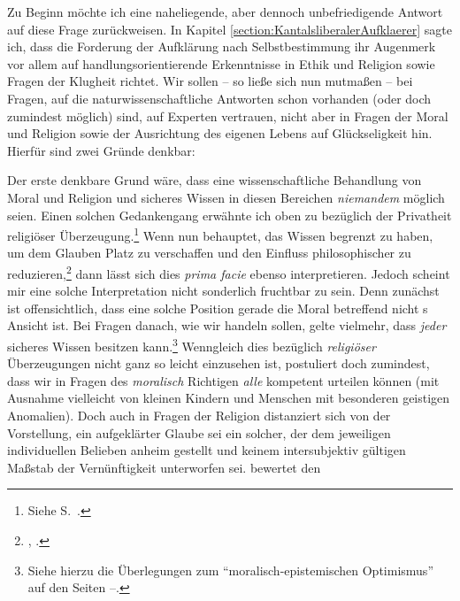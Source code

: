 Zu Beginn möchte ich eine naheliegende, aber dennoch unbefriedigende Antwort auf
diese Frage zurückweisen. In Kapitel \ref{section:KantalsliberalerAufklaerer}
sagte ich, dass die Forderung der Aufklärung nach Selbstbestimmung ihr Augenmerk
vor allem auf handlungsorientierende Erkenntnisse in Ethik und Religion sowie
Fragen der Klugheit richtet. Wir sollen -- so ließe sich nun mutmaßen -- bei
Fragen, auf die naturwissenschaftliche Antworten schon vorhanden (oder doch
zumindest möglich) sind, auf Experten vertrauen, nicht aber in Fragen der Moral
und Religion sowie der Ausrichtung des eigenen Lebens auf Glückseligkeit hin.
Hierfür sind zwei Gründe denkbar:
\begin{nummerierung}
\item Der erste denkbare Grund wäre, dass eine wissenschaftliche Behandlung von
Moral und Religion und sicheres Wissen in diesen Bereichen \emph{niemandem}
möglich seien. Einen solchen Gedankengang erwähnte ich oben zu
 bezüglich der Privatheit religiöser Überzeugung.\footnote{Siehe
S.~\pageref{ThomasiusZuPrivatheitreligioesenBekenntnisses}.} Wenn 
nun behauptet, das Wissen begrenzt zu haben, um dem Glauben Platz zu verschaffen
und den Einfluss philosophischer  zu
reduzieren,\footnote{\cite[Vgl.][B
xxx--xxxii]{Kant:KritikderreinenVernunft2003}, \cite[][III:
19.5--37]{Kant:GesammelteWerke1900ff.}.} dann lässt sich dies \emph{prima facie}
ebenso interpretieren. Jedoch scheint mir eine solche Interpretation nicht
sonderlich fruchtbar zu sein. Denn zunächst ist offensichtlich, dass eine solche
Position gerade die Moral betreffend nicht s Ansicht ist.
Bei Fragen danach, wie wir handeln sollen, gelte vielmehr, dass \emph{jeder} sicheres Wissen besitzen
kann.\footnote{Siehe hierzu die Überlegungen zum
\enquote{moralisch-epistemischen Optimismus} auf den Seiten
\pageref{Abschnitt:moralischepistemischerOptimismus}--\pageref{Abschnitt:moralischepistemischerOptimismus-Ende}.}
Wenngleich dies bezüglich \emph{religiöser} Überzeugungen nicht ganz so leicht
einzusehen ist, postuliert  doch zumindest, dass wir in
Fragen des \emph{moralisch} Richtigen \emph{alle} kompetent urteilen können (mit
Ausnahme vielleicht von kleinen Kindern und Menschen mit besonderen geistigen
Anomalien). Doch auch in Fragen der Religion distanziert sich
 von der Vorstellung, ein aufgeklärter Glaube sei ein solcher, der dem jeweiligen
individuellen Belieben anheim gestellt und keinem intersubjektiv gültigen
Maßstab der Vernünftigkeit unterworfen sei.  bewertet den

\end{nummerierung}
